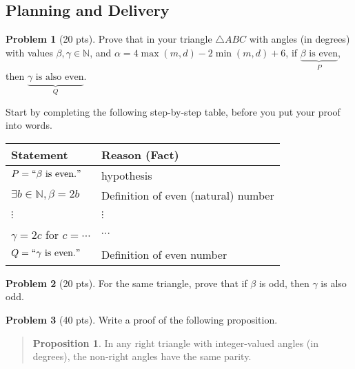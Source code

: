 \documentclass[11pt]{article}
\theoremstyle{definition}
\newtheorem{problem}{Problem}
\theoremstyle{theorem}
\newtheorem*{proposition*}{Proposition}
\begin{document}
\subsection*{Planning and Delivery}
\begin{problem}[20 pts]
  Prove that in your triangle $\triangle ABC$ with angles (in degrees) with values $\beta, \gamma \in \mathbb{N}$, and
  $\alpha=4\max(m,d)-2\min(m,d)+6$, if $\underbrace{\beta \text{ is even}}_{P}$, then
  $\underbrace{\gamma \text{ is also even}}_{Q}$.

  Start by completing the following step-by-step table, before you put your proof into words.
  \begin{center}
    \begin{tabular}{|l|p{10cm}|}
      \hline
      \textbf{Statement}                     & \textbf{Reason (Fact)} \\ \hline
      $P = ``\beta \text{ is even.}"$         & hypothesis \\ \hline
      $\exists b \in \mathbb{N}, \beta = 2b$ & Definition of even (natural) number \\ \hline
      &  \\ 
      \hspace{1cm} $\vdots$ & \hspace{4cm} $\vdots$ \\ 
      & \\ \hline
      $\gamma=2c$ for $c=\dotsb$             & $\dotsb$ \\ \hline
      $Q = ``\gamma \text{ is even.}"$        & Definition of even number \\ \hline
    \end{tabular}
  \end{center}
\end{problem}

\begin{problem}[20 pts]
  For the same triangle, prove that if $\beta$ is odd, then $\gamma$ is also odd.
\end{problem}

\begin{problem}[40 pts]
  Write a proof of the following proposition.
  \vspace*{-0.75cm}
  \begin{quote}
    \begin{proposition*}
      In any right triangle with integer-valued angles (in degrees), the non-right angles have the same parity.
    \end{proposition*}
    \end{quote}
\end{problem}
\end{document}
